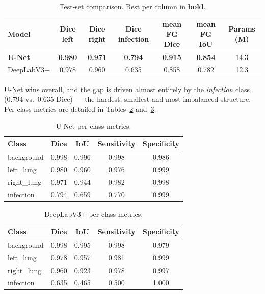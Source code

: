 \documentclass[11pt,a4paper]{article}
\begin{document}
\begin{table}[H]
\centering
\caption{Test-set comparison. Best per column in \textbf{bold}.}
\label{tab:compare}
\begin{tabular}{lcccccc}
\toprule
Model & Dice left & Dice right & Dice infection & mean FG Dice & mean FG IoU & Params (M) \\
\midrule
\textbf{U-Net} & \textbf{0.980} & \textbf{0.971} & \textbf{0.794} & \textbf{0.915} & \textbf{0.854} & 14.3 \\
DeepLabV3+     & 0.978 & 0.960 & 0.635 & 0.858 & 0.782 & 12.3 \\
\bottomrule
\end{tabular}
\end{table}

U-Net wins overall, and the gap is driven almost entirely by the \emph{infection} class
(0.794 vs.\ 0.635 Dice) --- the hardest, smallest and most imbalanced structure. Per-class
metrics are detailed in Tables~\ref{tab:unet} and~\ref{tab:deeplab}.

\begin{table}[H]
\centering
\caption{U-Net per-class metrics.}
\label{tab:unet}
\begin{tabular}{lcccc}
\toprule
Class & Dice & IoU & Sensitivity & Specificity \\
\midrule
background & 0.998 & 0.996 & 0.998 & 0.986 \\
left\_lung & 0.980 & 0.960 & 0.976 & 0.999 \\
right\_lung & 0.971 & 0.944 & 0.982 & 0.998 \\
infection & 0.794 & 0.659 & 0.770 & 0.999 \\
\bottomrule
\end{tabular}
\end{table}

\begin{table}[H]
\centering
\caption{DeepLabV3+ per-class metrics.}
\label{tab:deeplab}
\begin{tabular}{lcccc}
\toprule
Class & Dice & IoU & Sensitivity & Specificity \\
\midrule
background & 0.998 & 0.995 & 0.998 & 0.979 \\
left\_lung & 0.978 & 0.957 & 0.981 & 0.999 \\
right\_lung & 0.960 & 0.923 & 0.978 & 0.997 \\
infection & 0.635 & 0.465 & 0.500 & 1.000 \\
\bottomrule
\end{tabular}
\end{table}
\end{document}
